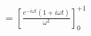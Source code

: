 \documentclass[preview]{standalone}
\begin{document}
\begin{align*}
&=\left[\frac{e^{-i\omega t}(1+i\omega t)}{\omega^{2}}\right]_{0}^{+1} \\
\end{align*}
\end{document}
